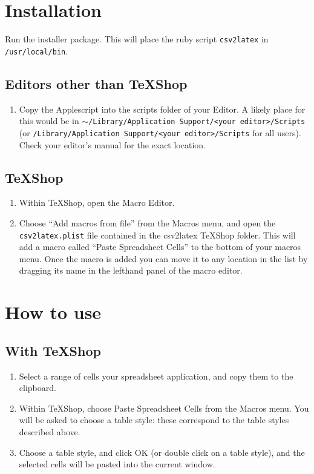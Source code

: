 \documentclass[11pt]{article}
\begin{document}
\section{Installation}
Run the installer package.  This will place the ruby script \texttt{csv2latex} in \texttt{/usr/local/bin}.
\subsection{Editors other than TeXShop}
\begin{enumerate}
\item Copy the Applescript into the scripts folder of your Editor.  A likely place for this would be in \texttt{$\sim$/Library/Application Support/<your editor>/Scripts} (or \texttt{/Library/Application Support/<your editor>/Scripts} for all users). Check your editor's manual for the exact location.
\end{enumerate}
\subsection{TeXShop}
\begin{enumerate}
\item Within TeXShop, open the Macro Editor.
\item Choose ``Add macros from file'' from the Macros menu, and open the \texttt{csv2latex.plist} file contained in the csv2latex TeXShop folder. This will add a macro called ``Paste Spreadsheet Cells'' to the bottom of your macros menu.  Once the macro is added you can move it to any location in the list by dragging its name in the lefthand panel of the macro editor. 
\end{enumerate}


\section{How to use}
\subsection{With TeXShop}
\begin{enumerate}
\item Select a range of cells your spreadsheet application, and copy them to the clipboard.

\item Within TeXShop, choose Paste Spreadsheet Cells from the Macros menu.  You will be asked to choose a table style: these correspond to the table styles described above.

\item Choose a table style, and click OK (or double click on a table style), and the selected cells will be pasted into the current window.
\end{enumerate}
\end{document}
